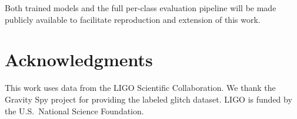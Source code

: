 \documentclass[12pt]{article}
\begin{document}
Both trained models and the full per-class evaluation pipeline will be made
publicly available to facilitate reproduction and extension of this work.


\section*{Acknowledgments}

This work uses data from the LIGO Scientific Collaboration.
We thank the Gravity Spy project for providing the labeled glitch dataset.
LIGO is funded by the U.S.\ National Science Foundation.

\end{document}
